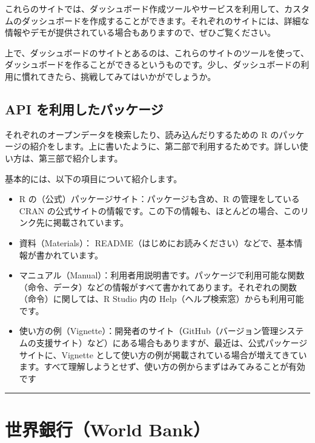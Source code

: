 \documentclass[
  xelatex, ja=standard]{bxjsbook}
\theoremstyle{definition}
\theoremstyle{definition}
\theoremstyle{definition}
\theoremstyle{definition}
\theoremstyle{remark}
\begin{document}
これらのサイトでは、ダッシュボード作成ツールやサービスを利用して、カスタムのダッシュボードを作成することができます。それぞれのサイトには、詳細な情報やデモが提供されている場合もありますので、ぜひご覧ください。

上で、ダッシュボードのサイトとあるのは、これらのサイトのツールを使って、ダッシュボードを作ることができるというものです。少し、ダッシュボードの利用に慣れてきたら、挑戦してみてはいかがでしょうか。

\hypertarget{api-ux3092ux5229ux7528ux3057ux305fux30d1ux30c3ux30b1ux30fcux30b8}{%
\section{API を利用したパッケージ}\label{api-ux3092ux5229ux7528ux3057ux305fux30d1ux30c3ux30b1ux30fcux30b8}}

それぞれのオープンデータを検索したり、読み込んだりするための R のパッケージの紹介をします。上に書いたように、第二部で利用するためです。詳しい使い方は、第三部で紹介します。

基本的には、以下の項目について紹介します。

\begin{itemize}
\item
  R の（公式）パッケージサイト：パッケージも含め、R の管理をしている CRAN の公式サイトの情報です。この下の情報も、ほとんどの場合、このリンク先に掲載されています。
\item
  資料（Materials）： README（はじめにお読みください）などで、基本情報が書かれています。
\item
  マニュアル（Manual）：利用者用説明書です。パッケージで利用可能な関数（命令、データ）などの情報がすべて書かれてあります。それぞれの関数（命令）に関しては、R Studio 内の Help（ヘルプ検索窓）からも利用可能です。
\item
  使い方の例（Vignette）：開発者のサイト（GitHub（バージョン管理システムの支援サイト）など）にある場合もありますが、最近は、公式パッケージサイトに、Vignette として使い方の例が掲載されている場合が増えてきています。すべて理解しようとせず、使い方の例からまずはみてみることが有効です
\end{itemize}

\begin{center}\rule{0.5\linewidth}{0.5pt}\end{center}

\hypertarget{worldbank-site}{%
\chapter{世界銀行（World Bank）}\label{worldbank-site}}
\end{document}
